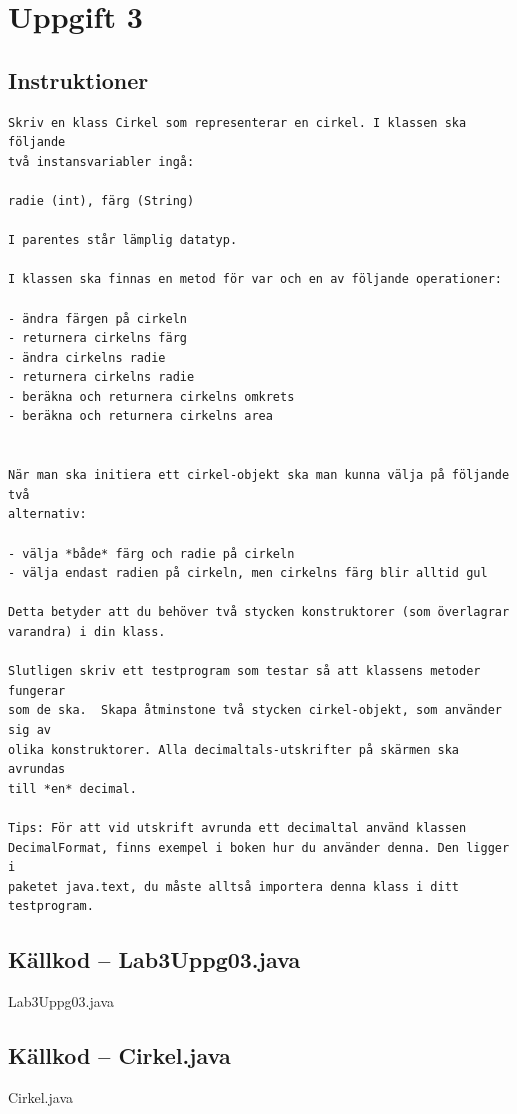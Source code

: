 \section{Uppgift 3}\label{sec:uppg03}

\subsection{Instruktioner}
\begin{verbatim}
Skriv en klass Cirkel som representerar en cirkel. I klassen ska följande
två instansvariabler ingå:

radie (int), färg (String)

I parentes står lämplig datatyp.

I klassen ska finnas en metod för var och en av följande operationer:

- ändra färgen på cirkeln
- returnera cirkelns färg
- ändra cirkelns radie
- returnera cirkelns radie
- beräkna och returnera cirkelns omkrets
- beräkna och returnera cirkelns area


När man ska initiera ett cirkel-objekt ska man kunna välja på följande två
alternativ:

- välja *både* färg och radie på cirkeln
- välja endast radien på cirkeln, men cirkelns färg blir alltid gul

Detta betyder att du behöver två stycken konstruktorer (som överlagrar
varandra) i din klass.

Slutligen skriv ett testprogram som testar så att klassens metoder fungerar
som de ska.  Skapa åtminstone två stycken cirkel-objekt, som använder sig av
olika konstruktorer. Alla decimaltals-utskrifter på skärmen ska avrundas
till *en* decimal.

Tips: För att vid utskrift avrunda ett decimaltal använd klassen
DecimalFormat, finns exempel i boken hur du använder denna. Den ligger i
paketet java.text, du måste alltså importera denna klass i ditt testprogram.
\end{verbatim}


\subsection{Källkod -- Lab3Uppg03.java}
\caption{Lab3Uppg03.java}
\label{src:uppg03}

\subsection{Källkod -- Cirkel.java}
\caption{Cirkel.java}
\label{src:cirkel}


